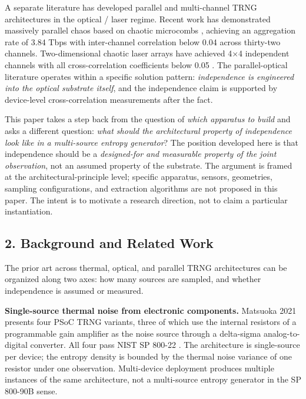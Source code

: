 A separate literature has developed parallel and multi-channel TRNG
architectures in the optical / laser regime. Recent work has
demonstrated massively parallel chaos based on chaotic microcombs
\cite{ref5}, achieving an aggregation rate of 3.84 Tbps with inter-channel
correlation below 0.04 across thirty-two channels. Two-dimensional
chaotic laser arrays have achieved 4×4 independent channels with all
cross-correlation coefficients below 0.05 \cite{ref6}. The parallel-optical
literature operates within a specific solution pattern:
\emph{independence is engineered into the optical substrate itself}, and
the independence claim is supported by device-level cross-correlation
measurements after the fact.

This paper takes a step back from the question of \emph{which apparatus
to build} and asks a different question: \emph{what should the
architectural property of independence look like in a multi-source
entropy generator}? The position developed here is that independence
should be a \emph{designed-for and measurable property of the joint
observation}, not an assumed property of the substrate. The argument is
framed at the architectural-principle level; specific apparatus,
sensors, geometries, sampling configurations, and extraction algorithms
are not proposed in this paper. The intent is to motivate a research
direction, not to claim a particular instantiation.

\subsection{2. Background and Related
Work}\label{background-and-related-work}

The prior art across thermal, optical, and parallel TRNG architectures
can be organized along two axes: how many sources are sampled, and
whether independence is assumed or measured.

\textbf{Single-source thermal noise from electronic components.}
Matsuoka 2021 \cite{ref2} presents four PSoC TRNG variants, three of which
use the internal resistors of a programmable gain amplifier as the noise
source through a delta-sigma analog-to-digital converter. All four pass
NIST SP 800-22 \cite{ref10}. The architecture is single-source per device;
the entropy density is bounded by the thermal noise variance of one
resistor under one observation. Multi-device deployment produces
multiple instances of the same architecture, not a multi-source entropy
generator in the SP 800-90B sense.

